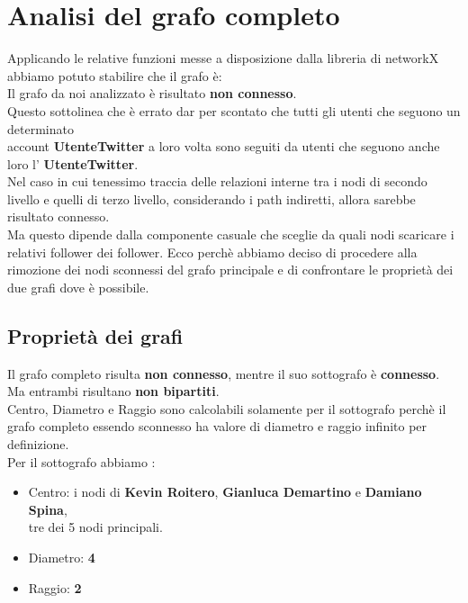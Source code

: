 \documentclass[a4paper,11pt]{report}
\begin{document}
\pagebreak
\section{Analisi del grafo completo}
Applicando le relative funzioni messe a disposizione dalla libreria di networkX abbiamo potuto stabilire che il grafo è:\\
Il grafo da noi analizzato è risultato \textbf{non connesso}.\\
Questo sottolinea che è errato dar per scontato che tutti gli utenti che seguono un determinato \\account \textbf{UtenteTwitter} a loro volta sono seguiti da utenti che seguono anche loro l' \textbf{UtenteTwitter}. \newline \\Nel caso in cui tenessimo traccia delle relazioni interne tra i nodi di secondo livello e quelli di terzo livello, considerando i path indiretti, allora sarebbe risultato connesso.\\ Ma questo dipende dalla componente casuale che sceglie da quali nodi scaricare i relativi follower dei follower.\newline
Ecco perchè abbiamo deciso di procedere alla rimozione dei nodi sconnessi del grafo principale e di confrontare le proprietà dei due grafi dove è possibile.

\subsection{Proprietà dei grafi}
Il grafo completo risulta \textbf{non connesso}, mentre il suo sottografo è \textbf{connesso}.\\
Ma entrambi risultano \textbf{non bipartiti}.\\
Centro, Diametro e Raggio sono calcolabili solamente per il sottografo perchè il grafo completo essendo sconnesso ha valore di diametro e raggio infinito per definizione.\\
Per il sottografo abbiamo :
		\begin{itemize}
			\item Centro: i nodi di \textbf{Kevin Roitero}, \textbf{Gianluca Demartino} e \textbf{Damiano Spina},\\ tre dei 5 nodi principali.
			\item Diametro:  \textbf{4}
			\item Raggio: \textbf{2}
		\end{itemize}
\end{document}
